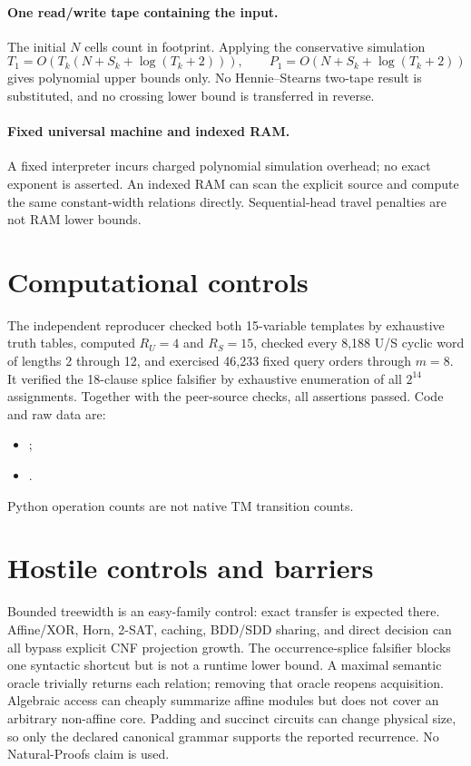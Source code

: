 \documentclass[11pt]{article}
\begin{document}
\paragraph{One read/write tape containing the input.}
The initial $N$ cells count in footprint. Applying the conservative simulation
\[
 T_1=O(T_k(N+S_k+\log(T_k+2))),\qquad
 P_1=O(N+S_k+\log(T_k+2))
\]
gives polynomial upper bounds only. No Hennie--Stearns two-tape result is
substituted, and no crossing lower bound is transferred in reverse.
\paragraph{Fixed universal machine and indexed RAM.}
A fixed interpreter incurs charged polynomial simulation overhead; no exact
exponent is asserted. An indexed RAM can scan the explicit source and compute
the same constant-width relations directly. Sequential-head travel penalties
are not RAM lower bounds.

\section{Computational controls}
The independent reproducer checked both 15-variable templates by exhaustive
truth tables, computed $R_U=4$ and $R_S=15$, checked every 8,188 U/S cyclic
word of lengths 2 through 12, and exercised 46,233 fixed query orders through
$m=8$. It verified the 18-clause splice falsifier by exhaustive enumeration
of all $2^{14}$ assignments. Together with the peer-source checks, all
assertions passed. Code and raw data are:
\begin{itemize}
\item {};
\item {}.
\end{itemize}
Python operation counts are not native TM transition counts.

\section{Hostile controls and barriers}
Bounded treewidth is an easy-family control: exact transfer is expected there.
Affine/XOR, Horn, 2-SAT, caching, BDD/SDD sharing, and direct decision can all
bypass explicit CNF projection growth. The occurrence-splice falsifier blocks
one syntactic shortcut but is not a runtime lower bound. A maximal semantic
oracle trivially returns each relation; removing that oracle reopens acquisition.
Algebraic access can cheaply summarize affine modules but does not cover an
arbitrary non-affine core. Padding and succinct circuits can change physical
size, so only the declared canonical grammar supports the reported recurrence.
No Natural-Proofs claim is used.
\end{document}
